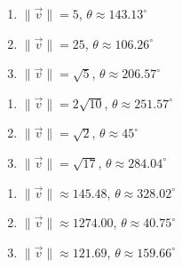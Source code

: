 \begin{multicols}{3}

\begin{enumerate}

\setcounter{enumi}{\value{HW}}

\item $\|\vec{v}\| = 5$, $\theta \approx 143.13^{\circ}$
\item $\|\vec{v}\| = 25$, $\theta \approx 106.26^{\circ}$
\item $\|\vec{v}\| = \sqrt{5}$, $\theta \approx 206.57^{\circ}$

\setcounter{HW}{\value{enumi}}

\end{enumerate}

\end{multicols}

\begin{multicols}{3}

\begin{enumerate}

\setcounter{enumi}{\value{HW}}

\item  $\|\vec{v}\| = 2\sqrt{10}$, $\theta \approx 251.57^{\circ}$
\item  $\|\vec{v}\| = \sqrt{2}$, $\theta \approx 45^{\circ}$
\item $\|\vec{v}\| = \sqrt{17}$, $\theta \approx 284.04^{\circ}$

\setcounter{HW}{\value{enumi}}

\end{enumerate}

\end{multicols}

\begin{multicols}{3}

\begin{enumerate}

\setcounter{enumi}{\value{HW}}

\item \small $\|\vec{v}\| \approx 145.48$, $\theta \approx 328.02^{\circ}$ \normalsize
\item \small $\|\vec{v}\| \approx 1274.00$, $\theta \approx 40.75^{\circ}$ \normalsize
\item \small $\|\vec{v}\| \approx 121.69$, $\theta \approx 159.66^{\circ}$ \normalsize

\setcounter{HW}{\value{enumi}}

\end{enumerate}

\end{multicols}

